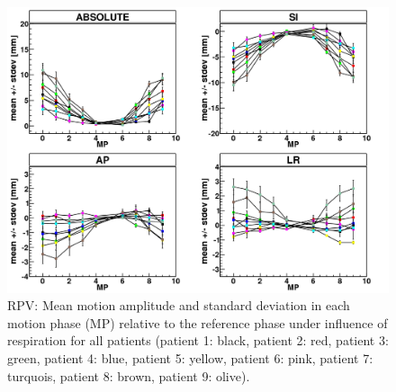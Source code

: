 \documentclass[type=dr, dr=rernat, accentcolor=tud7b,colorbacktitle, bigchapter, openright, twoside, 12pt ]{tudthesis}
\begin{document}
\begin{figure}[H]
\begin{center}
 \includegraphics[scale=0.22]{MDACC_allPatients_RESP_RPV.png}
\caption{RPV: Mean motion amplitude and standard deviation in each motion phase (MP) relative to the reference phase under influence of 
respiration for all patients (patient 1: black, patient 2: red, patient 3: green, patient 4: blue, patient 5: yellow, patient 6: pink, patient 
7: turquois, patient 8: brown, patient 9: olive). }
\label{motion_resp_all_rpv}
\end{center}
\end{figure}

\newpage
\end{document}
